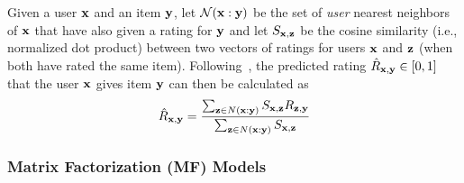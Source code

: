 Given a user $\mathbf{x}$ and an item $\mathbf{y}$, %
let ${\mathcal N}(\mathbf{x}:\mathbf{y})$
be the set of
\emph{user} nearest neighbors of $\mathbf{x}$ that have also given a rating
for $\mathbf{y}$
and let $S_{\mathbf{x},\mathbf{z}}$ be the cosine similarity (i.e., normalized
dot product) between two vectors of ratings for users $\mathbf{x}$ and $\mathbf{z}$
(when both have rated the same item).  
Following~\cite{bellkor},
the predicted rating $\hat{R}_{\mathbf{x},\mathbf{y}} \in [0,1]$ that the user $\mathbf{x}$
gives item $\mathbf{y}$ can then be calculated as
\begin{equation}
\hat{R}_{\mathbf{x},\mathbf{y}} = \frac{\sum_{\mathbf{z} \in N(\mathbf{x}:\mathbf{y})} {S_{\mathbf{x},\mathbf{z}} R_{\mathbf{z},\mathbf{y}}} } {\sum_{\mathbf{z} \in N(\mathbf{x}:\mathbf{y})}{S_{\mathbf{x},\mathbf{z}}}}\end{equation}


\subsubsection{Matrix Factorization (MF) Models}
\label{sec:mf}

